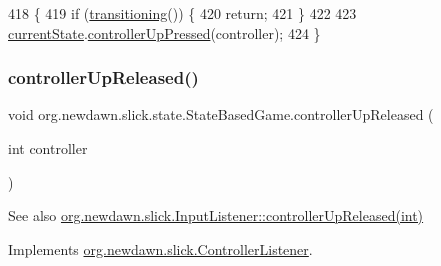 \begin{DoxyCode}
418                                                     \{
419         \textcolor{keywordflow}{if} (\mbox{\hyperlink{classorg_1_1newdawn_1_1slick_1_1state_1_1_state_based_game_ae869c08778875776081935a090d4c92f}{transitioning}}()) \{
420             \textcolor{keywordflow}{return};
421         \}
422         
423         \mbox{\hyperlink{classorg_1_1newdawn_1_1slick_1_1state_1_1_state_based_game_a6a45e68094bb9b7ec30b8a8b7d415766}{currentState}}.\mbox{\hyperlink{interfaceorg_1_1newdawn_1_1slick_1_1_controller_listener_a7cb917761de1e555b23469042b6f1e03}{controllerUpPressed}}(controller);
424     \}
\end{DoxyCode}
\mbox{\label{classorg_1_1newdawn_1_1slick_1_1state_1_1_state_based_game_a7b4ef38f15fdd419c18b7bddf6958a04}} 
\subsubsection{\texorpdfstring{controller\+Up\+Released()}{controllerUpReleased()}}
{\footnotesize\ttfamily void org.\+newdawn.\+slick.\+state.\+State\+Based\+Game.\+controller\+Up\+Released (\begin{DoxyParamCaption}\item[{int}]{controller }\end{DoxyParamCaption})\hspace{0.3cm}{\ttfamily [inline]}}

\begin{DoxySeeAlso}{See also}
\mbox{\hyperlink{interfaceorg_1_1newdawn_1_1slick_1_1_controller_listener_a1342ad9ad1f7314b4eb10c20c21a9d50}{org.\+newdawn.\+slick.\+Input\+Listener\+::controller\+Up\+Released(int)}} 
\end{DoxySeeAlso}


Implements \mbox{\hyperlink{interfaceorg_1_1newdawn_1_1slick_1_1_controller_listener_a1342ad9ad1f7314b4eb10c20c21a9d50}{org.\+newdawn.\+slick.\+Controller\+Listener}}.


